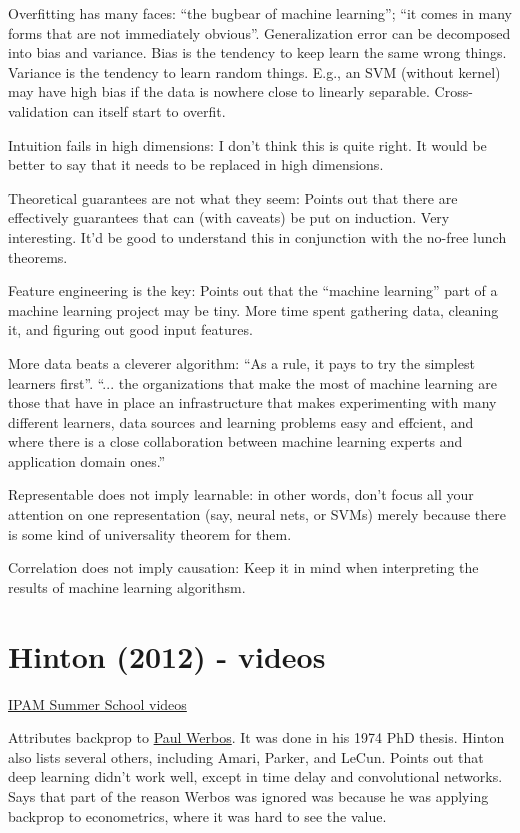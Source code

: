 \documentclass[12pt]{report}
\newcommand{\link}[2]{\href{#1}{#2}}
\begin{document}
Overfitting has many faces: ``the bugbear of machine learning''; ``it
comes in many forms that are not immediately obvious''.
Generalization error can be decomposed into bias and variance.  Bias
is the tendency to keep learn the same wrong things.  Variance is the
tendency to learn random things.  E.g., an SVM (without kernel) may
have high bias if the data is nowhere close to linearly separable.
Cross-validation can itself start to overfit.

Intuition fails in high dimensions: I don't think this is quite right.
It would be better to say that it needs to be replaced in high
dimensions.

Theoretical guarantees are not what they seem: Points out that there
are effectively guarantees that can (with caveats) be put on
induction.  Very interesting.  It'd be good to understand this in
conjunction with the no-free lunch theorems.

Feature engineering is the key: Points out that the ``machine
learning'' part of a machine learning project may be tiny.  More time
spent gathering data, cleaning it, and figuring out good input
features.

More data beats a cleverer algorithm: ``As a rule, it pays to try the
simplest learners first''.  ``... the organizations that make the most
of machine learning are those that have in place an infrastructure
that makes experimenting with many different learners, data sources
and learning problems easy and effcient, and where there is a close
collaboration between machine learning experts and application domain
ones.''

Representable does not imply learnable: in other words, don't focus
all your attention on one representation (say, neural nets, or SVMs)
merely because there is some kind of universality theorem for them.

Correlation does not imply causation: Keep it in mind when
interpreting the results of machine learning algorithsm.

\section{Hinton (2012) - videos}

\link{https://www.ipam.ucla.edu/schedule.aspx?pc=gss2012}{IPAM Summer School videos}

Attributes backprop to \link{http://www.werbos.com/}{Paul Werbos}.  It
was done in his 1974 PhD thesis.  Hinton also lists several others,
including Amari, Parker, and LeCun.  Points out that deep learning
didn't work well, except in time delay and convolutional networks.
Says that part of the reason Werbos was ignored was because he was
applying backprop to econometrics, where it was hard to see the value.
\end{document}
